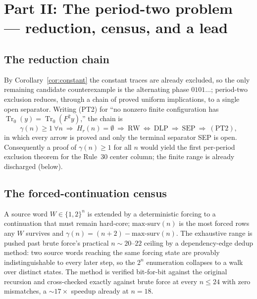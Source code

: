 \documentclass[11pt]{article}
\theoremstyle{definition}
\newcommand{\Tr}{\operatorname{Tr}}
\newcommand{\gm}{\gamma}
\begin{document}
\section{Part II: The period-two problem --- reduction, census, and a lead}
\label{sec:periodtwo}

\subsection{The reduction chain}

By Corollary~\ref{cor:constant} the constant traces are already excluded, so
the only remaining candidate counterexample is the alternating phase
$0101\ldots$; period-two exclusion reduces, through a chain of proved uniform
implications, to a single open separator. Writing (PT2) for ``no nonzero finite configuration has
$\Tr_0(y)=\Tr_0(F^2 y)$,'' the chain is
\begin{equation}\label{eq:chain}
 \gm(n)\ge1\ \forall n\ \Rightarrow\ H_r(n)=\emptyset\ \Rightarrow\
 \mathrm{RW}\ \Leftrightarrow\ \mathrm{DLP}\ \Rightarrow\ \mathrm{SEP}\
 \Rightarrow\ \mathrm{(PT2)},
\end{equation}
in which every arrow is proved and only the terminal separator SEP is open.
Consequently a proof of $\gm(n)\ge1$ for all $n$ would yield the first
per-period exclusion theorem for the Rule~30 center column; the finite range is
already discharged (below).

\subsection{The forced-continuation census}

A source word $W\in\{1,2\}^n$ is extended by a deterministic forcing to a
continuation that must remain hard-core; $\mathrm{max\text{-}surv}(n)$ is the
most forced rows any $W$ survives and $\gm(n)=(n+2)-\mathrm{max\text{-}surv}(n)$.
The exhaustive range is pushed past brute force's practical $n\sim20$--$22$
ceiling by a dependency-edge dedup method: two source words reaching the same
forcing state are provably indistinguishable to every later step, so the
$2^n$ enumeration collapses to a walk over distinct states. The method is
verified bit-for-bit against the original recursion and cross-checked exactly
against brute force at every $n\le24$ with zero mismatches, a $\sim17\times$
speedup already at $n=18$.
\end{document}
